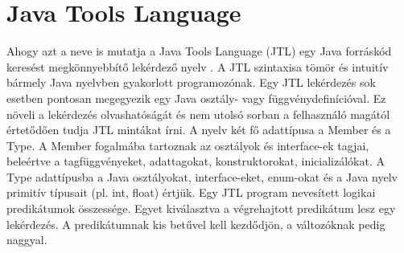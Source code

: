 \documentclass[a4paper,12pt]{report}
\begin{document}
\section{Java Tools Language}
\par Ahogy azt a neve is mutatja a Java Tools Language (JTL) egy Java forráskód keresést megkönnyebbítő lekérdező nyelv \cite{jtl}. A JTL szintaxisa tömör és intuitív bármely Java nyelvben gyakorlott programozónak. Egy JTL lekérdezés sok esetben pontosan megegyezik egy Java osztály- vagy függvénydefinícióval. Ez növeli a lekérdezés olvashatóságát és nem utolsó sorban a felhasználó magától értetődően tudja JTL mintákat írni. A nyelv két fő adattípusa a Member és a Type. A Member fogalmába tartoznak az osztályok és interface-ek tagjai, beleértve a tagfüggvényeket, adattagokat, konstruktorokat, inicializálókat. A Type adattípusba a Java osztályokat, interface-eket, enum-okat és a Java nyelv primitív típusait (pl. int, float) értjük. Egy JTL program nevesített logikai predikátumok összessége.  Egyet kiválasztva a végrehajtott predikátum lesz egy lekérdezés. A predikátumnak kis betűvel kell kezdődjön, a változóknak pedig naggyal.
\end{document}
